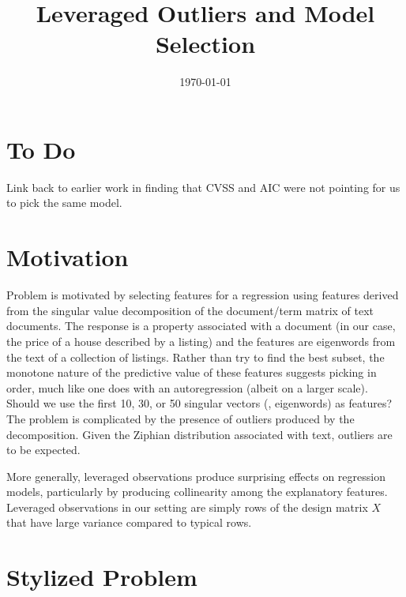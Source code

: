 \documentclass[12pt]{article}
\title{ Leveraged Outliers and Model Selection }
\date{\today}
\begin{document}


\section{ To Do }

 Link back to earlier work in finding that CVSS and AIC were not pointing for us
 to pick the same model.


\section{ Motivation }
\label{sec:motivation}

 Problem is motivated by selecting features for a regression using features
 derived from the singular value decomposition of the document/term matrix of
 text documents.  The response is a property associated with a document (in our
 case, the price of a house described by a listing) and the features are
 eigenwords from the text of a collection of listings.  Rather than try to find
 the best subset, the monotone nature of the predictive value of these features
 suggests picking in order, much like one does with an autoregression (albeit on
 a larger scale).  Should we use the first 10, 30, or 50 singular vectors (\ie,
 eigenwords) as features?  The problem is complicated by the presence of
 outliers produced by the decomposition.  Given the Ziphian distribution
 associated with text, outliers are to be expected.


 More generally, leveraged observations produce surprising effects on regression
 models, particularly by producing collinearity among the explanatory features.
  Leveraged observations in our setting are simply rows of the design matrix $X$
 that have large variance compared to typical rows.


\section{ Stylized Problem }
\label{sec:problem}
\end{document}
